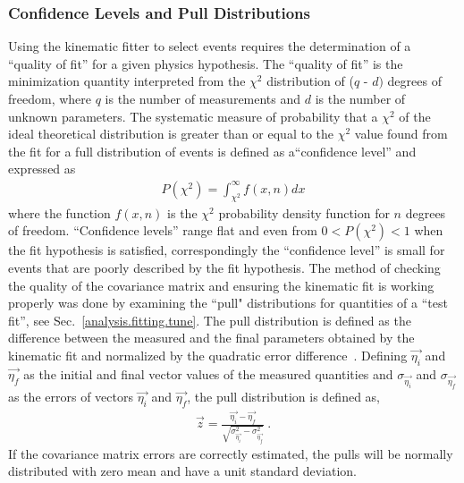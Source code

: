 \subsubsection{Confidence Levels and Pull Distributions}
Using the kinematic fitter to select events requires the determination of a ``quality of fit'' for a given physics hypothesis. The ``quality of fit''  is the minimization quantity interpreted from the $\chi^2$ distribution of ($q$ - $d)$ degrees of freedom, where $q$ is the number of measurements and $d$ is the number of unknown parameters. The systematic measure of probability that a $\chi^2$ of the ideal theoretical distribution is greater than or equal to the $\chi^2$ value found from the fit for a full distribution of events is defined as a``confidence level'' and expressed as 
\begin{align}
P(\chi^2)=\int^{\infty}_{\chi^2}f(x,n)dx
\end{align}
where the function $f(x,n)$ is the $\chi^2$ probability density function for $n$ degrees of freedom. ``Confidence levels'' range flat and even from $0<P(\chi^2)<1$  when the fit hypothesis is satisfied, correspondingly the ``confidence level''  is small for events that are poorly described by the fit hypothesis.
The method of checking the quality of the covariance matrix and ensuring the kinematic fit is working properly was done by examining the ``pull" distributions for quantities of a ``test fit'', see Sec.~\ref{analysis.fitting.tune}. The pull distribution is defined as the difference between the measured and the final parameters obtained by the kinematic fit and normalized by the quadratic error difference~\cite{dustin.kinfit}. Defining $\vec{\eta_i}$ and $\vec{\eta_f}$ as the initial and final vector values of the measured quantities and  $\sigma_{\vec{\eta_i}}$ and $\sigma_{\vec{\eta_f}}$ as the errors of vectors $\vec{\eta_i}$ and $\vec{\eta_f}$, the pull distribution is defined as,
\begin{align}
\vec{z} = \frac{\vec{\eta_i} - \vec{\eta_f}}{\sqrt{\sigma_{\vec{\eta_i}}^2 - \sigma_{\vec{\eta_f}}^2}} \ .
\end{align}
%
If the covariance matrix errors are correctly estimated, the pulls will be normally distributed with zero mean and have a unit standard deviation.
